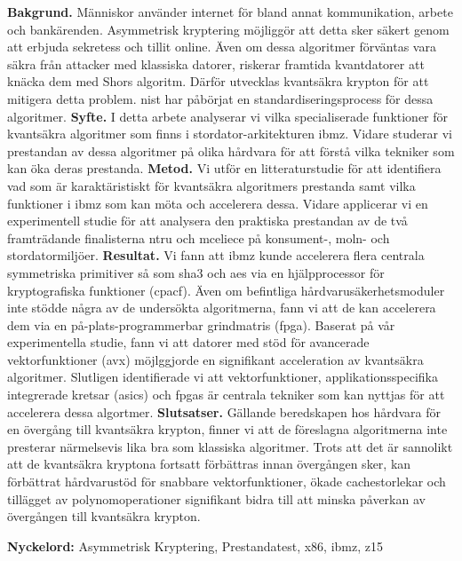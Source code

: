 \sammanfattning
\noindent
\textbf{Bakgrund.} Människor använder internet för bland annat kommunikation, arbete och bankärenden. Asymmetrisk kryptering möjliggör att detta sker säkert genom att erbjuda sekretess och tillit online. Även om dessa algoritmer förväntas vara säkra från attacker med klassiska datorer, riskerar framtida kvantdatorer att knäcka dem med Shors algoritm. Därför utvecklas kvantsäkra krypton för att mitigera detta problem. \acrfull{nist} har påbörjat en standardiseringsprocess för dessa algoritmer.\newline
\textbf{Syfte.} I detta arbete analyserar vi vilka specialiserade funktioner för kvantsäkra algoritmer som finns i stordator-arkitekturen \gls{ibmz}. Vidare studerar vi prestandan av dessa algoritmer på olika hårdvara för att förstå vilka tekniker som kan öka deras prestanda.\newline
\textbf{Metod.} Vi utför en litteraturstudie för att identifiera vad som är karaktäristiskt för kvantsäkra algoritmers prestanda samt vilka funktioner i \gls{ibmz} som kan möta och accelerera dessa. Vidare applicerar vi en experimentell studie för att analysera den praktiska prestandan av de två framträdande finalisterna \gls{ntru} och \gls{mceliece} på konsument-, moln- och stordatormiljöer.\newline
\textbf{Resultat.} Vi fann att \gls{ibmz} kunde accelerera flera centrala symmetriska primitiver så som \gls{sha3} och \gls{aes} via en hjälpprocessor för kryptografiska funktioner (\acrshort{cpacf}). Även om befintliga hårdvarusäkerhetsmoduler inte stödde några av de undersökta algoritmerna, fann vi att de kan accelerera dem via en på-plats-programmerbar grindmatris (\acrshort{fpga}). Baserat på vår experimentella studie, fann vi att datorer med stöd för avancerade vektorfunktioner (\gls{avx}) möjlggjorde en signifikant acceleration av kvantsäkra algoritmer. Slutligen identifierade vi att vektorfunktioner, applikationsspecifika integrerade kretsar (\acrshort{asic}s) och \acrshort{fpga}s är centrala tekniker som kan nyttjas för att accelerera dessa algortmer.\newline
\textbf{Slutsatser.} Gällande beredskapen hos hårdvara för en övergång till kvantsäkra krypton, finner vi att de föreslagna algoritmerna inte presterar närmelsevis lika bra som klassiska algoritmer. Trots att det är sannolikt att de kvantsäkra kryptona fortsatt förbättras innan övergången sker, kan förbättrat hårdvarustöd för snabbare vektorfunktioner, ökade cachestorlekar och tillägget av polynomoperationer signifikant bidra till att minska påverkan av övergången till kvantsäkra krypton.

\vspace{1cm}
\noindent
\textbf{Nyckelord:} Asymmetrisk Kryptering, Prestandatest, \gls{x86}, \gls{ibmz}, \gls{z15}

\cleardoublepage